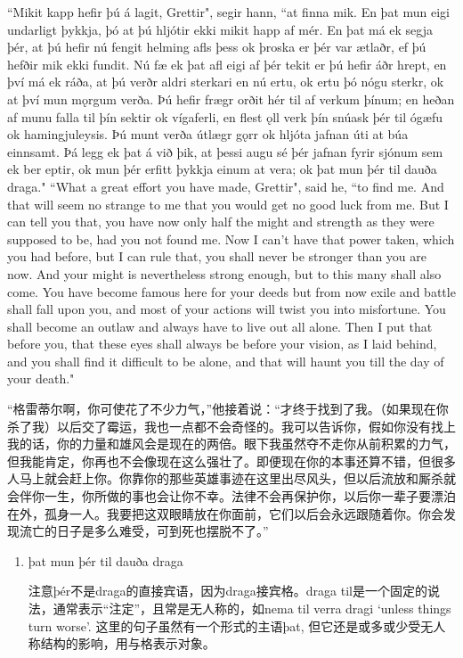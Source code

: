 \begin{paracol}{2}
    ``Mikit kapp hefir þú á lagit, Grettir", segir hann, ``at finna mik. En þat mun eigi undarligt þykkja, þó at þú hljótir ekki mikit happ af mér. En þat má ek segja þér, at þú hefir nú fengit helming afls þess ok þroska er þér var ætlaðr, ef þú hefðir mik ekki fundit. Nú fæ ek þat afl eigi af þér tekit er þú hefir áðr hrept, en því má ek ráða, at þú verðr aldri sterkari en nú ertu, ok ertu þó nógu sterkr, ok at því mun mǫrgum verða. Þú hefir frægr orðit hér til af verkum þínum; en heðan af munu falla til þín sektir ok vígaferli, en flest ǫll verk þín snúask þér til ógæfu ok hamingjuleysis. Þú munt verða útlægr gǫrr ok hljóta jafnan úti at búa einnsamt. Þá legg ek þat á við þik, at þessi augu sé þér jafnan fyrir sjónum sem ek ber eptir, ok mun þér erfitt þykkja einum at vera; ok þat mun þér til dauða draga."
    \switchcolumn
    ``What a great effort you have made, Grettir", said he, ``to find me. And that will seem no strange to me that you would get no good luck from me. But I can tell you that, you have now only half the might and strength as they were supposed to be, had you not found me. Now I can't have that power taken, which you had before, but I can rule that, you shall never be stronger than you are now. And your might is nevertheless strong enough, but to this many shall also come. You have become famous here for your deeds but from now exile and battle shall fall upon you, and most of your actions will twist you into misfortune. You shall become an outlaw and always have to live out all alone. Then I put that before you, that these eyes shall always be before your vision, as I laid behind, and you shall find it difficult to be alone, and that will haunt you till the day of your death."
\end{paracol}
\begin{translation*}{}
    “格雷蒂尔啊，你可使花了不少力气，”他接着说：“才终于找到了我。（如果现在你杀了我）以后交了霉运，我也一点都不会奇怪的。我可以告诉你，假如你没有找上我的话，你的力量和雄风会是现在的两倍。眼下我虽然夺不走你从前积累的力气，但我能肯定，你再也不会像现在这么强壮了。即便现在你的本事还算不错，但很多人马上就会赶上你。你靠你的那些英雄事迹在这里出尽风头，但以后流放和厮杀就会伴你一生，你所做的事也会让你不幸。法律不会再保护你，以后你一辈子要漂泊在外，孤身一人。我要把这双眼睛放在你面前，它们以后会永远跟随着你。你会发现流亡的日子是多么难受，可到死也摆脱不了。”
\end{translation*}
\begin{grammar*}{}
    \begin{enumerate}[leftmargin=*]
        \item þat mun þér til dauða draga

              注意þér不是draga的直接宾语，因为draga接宾格。draga til是一个固定的说法，通常表示“注定”，且常是无人称的，如nema til verra dragi `unless things turn worse'. 这里的句子虽然有一个形式的主语þat, 但它还是或多或少受无人称结构的影响，用与格表示对象。
    \end{enumerate}
\end{grammar*}
